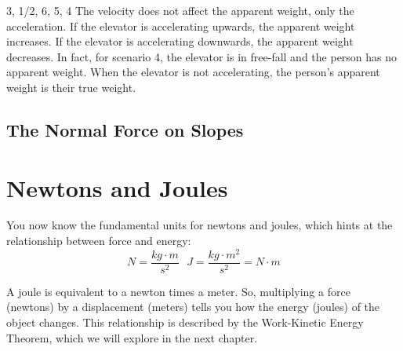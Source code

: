 \begin{Answer}[ref = elevator]
3, 1/2, 6, 5, 4
The velocity does not affect the apparent weight, only the acceleration. If the 
elevator is accelerating upwards, the apparent weight increases. If the elevator 
is accelerating downwards, the apparent weight decreases. In fact, for scenario 
4, the elevator is in free-fall and the person has no apparent weight. When the 
elevator is not accelerating, the person's apparent weight is their true weight. 
\end{Answer}

\subsection{The Normal Force on Slopes}

\section{Newtons and Joules}
You now know the fundamental units for newtons and joules, which hints at the 
relationship between force and energy:
$$N = \frac{kg \cdot m}{s^2} \text{     } J = \frac{kg \cdot m^2}{s^2} = N \cdot m$$

A joule is equivalent to a newton times a meter. So, multiplying a force 
(newtons) by a displacement (meters) tells you how the energy (joules) of the 
object changes. This relationship is described by the Work-Kinetic Energy Theorem, 
which we will explore in the next chapter. 
